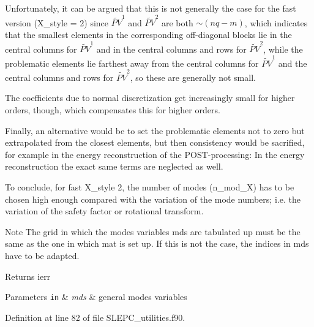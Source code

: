 Unfortunately, it can be argued that this is not generally the case for the fast version ({\ttfamily X\+\_\+style} = 2) since $\widetilde{PV}^1$ and $\widetilde{PV}^2$ are both $\sim (nq-m)$, which indicates that the smallest elements in the corresponding off-\/diagonal blocks lie in the central columns for $\widetilde{PV}^1$ and in the central columns and rows for $\widetilde{PV}^2$, while the problematic elements lie farthest away from the central columns for $\widetilde{PV}^1$ and the central columns and rows for $\widetilde{PV}^2$, so these are generally not small.

The coefficients due to normal discretization get increasingly small for higher orders, though, which compensates this for higher orders.

Finally, an alternative would be to set the problematic elements not to zero but extrapolated from the closest elements, but then consistency would be sacrified, for example in the energy reconstruction of the P\+O\+S\+T-\/processing\+: In the energy reconstruction the exact same terms are neglected as well.

To conclude, for fast {\ttfamily X\+\_\+style} 2, the number of modes ({\ttfamily n\+\_\+mod\+\_\+X}) has to be chosen high enough compared with the variation of the mode numbers; i.\+e. the variation of the safety factor or rotational transform.

\begin{DoxyNote}{Note}
The grid in which the modes variables {\ttfamily mds} are tabulated up must be the same as the one in which {\ttfamily mat} is set up. If this is not the case, the indices in {\ttfamily mds} have to be adapted.
\end{DoxyNote}
\begin{DoxyReturn}{Returns}
ierr
\end{DoxyReturn}

\begin{DoxyParams}[1]{Parameters}
\mbox{\tt in}  & {\em mds} & general modes variables \\
\hline
\end{DoxyParams}


Definition at line 82 of file S\+L\+E\+P\+C\+\_\+utilities.\+f90.

